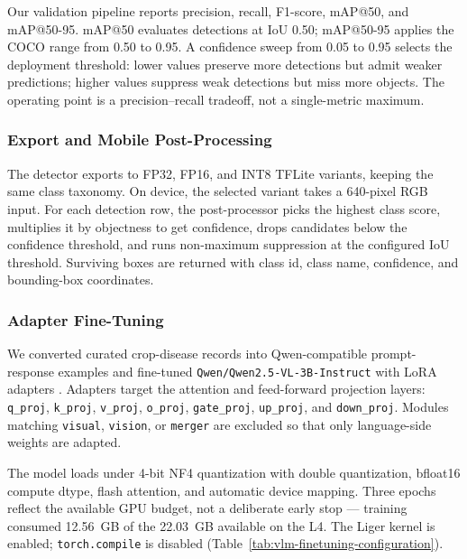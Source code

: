 Our validation pipeline reports precision, recall, F1-score, mAP@50, and mAP@50-95. mAP@50
evaluates detections at IoU 0.50; mAP@50-95 applies the COCO range from 0.50 to 0.95. A
confidence sweep from 0.05 to 0.95 selects the deployment threshold: lower values preserve
more detections but admit weaker predictions; higher values suppress weak detections but miss
more objects. The operating point is a precision--recall tradeoff, not a single-metric maximum.

\subsubsection{Export and Mobile Post-Processing}

The detector exports to FP32, FP16, and INT8 TFLite variants, keeping the same class taxonomy.
On device, the selected variant takes a 640-pixel RGB input. For each detection row, the
post-processor picks the highest class score, multiplies it by objectness to get confidence,
drops candidates below the confidence threshold, and runs non-maximum suppression at the
configured IoU threshold. Surviving boxes are returned with class id, class name, confidence,
and bounding-box coordinates.


\subsubsection{Adapter Fine-Tuning}

We converted curated crop-disease records into Qwen-compatible prompt-response examples and
fine-tuned \texttt{Qwen/Qwen2.5-VL-3B-Instruct} with LoRA adapters
\parencite{hu2021lora}. Adapters target the attention and feed-forward projection layers:
\texttt{q\_proj}, \texttt{k\_proj}, \texttt{v\_proj}, \texttt{o\_proj},
\texttt{gate\_proj}, \texttt{up\_proj}, and \texttt{down\_proj}. Modules matching
\texttt{visual}, \texttt{vision}, or \texttt{merger} are excluded so that only language-side
weights are adapted.

The model loads under 4-bit NF4 quantization with double quantization, bfloat16 compute dtype,
flash attention, and automatic device mapping. Three epochs reflect the available GPU budget,
not a deliberate early stop --- training consumed 12.56~GB of the 22.03~GB available on the
L4. The Liger kernel is enabled; \texttt{torch.compile} is disabled
(Table~\ref{tab:vlm-finetuning-configuration}).

